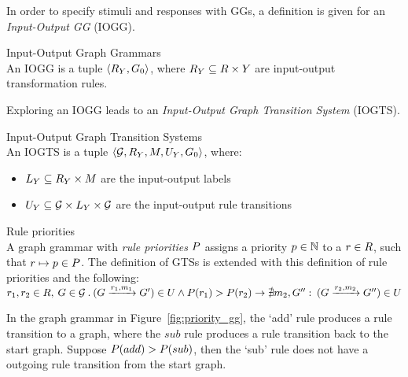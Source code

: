 In order to specify stimuli and responses with GGs, a definition is given for an \textit{Input-Output GG} (IOGG).
\vspace{10px}
\begin{definition} Input-Output Graph Grammars \\
An IOGG is a tuple $\langle R_{Y}, G_0\rangle$, where $R_{Y} \subseteq R \times Y$ are input-output transformation rules.
\end{definition}
\vspace{10px}

Exploring an IOGG leads to an \textit{Input-Output Graph Transition System} (IOGTS).
\vspace{10px}
\begin{definition} Input-Output Graph Transition Systems \\
An IOGTS is a tuple  $\langle \mathcal{G}, R_{Y}, M, U_{Y}, G_0\rangle$, where:
\begin{itemize}
\item {}$L_{Y} \subseteq R_{Y} \times M$ are the input-output labels
\item {}$U_{Y} \subseteq \mathcal{G} \times L_{Y} \times \mathcal{G}$ are the input-output rule transitions
\end{itemize}
\end{definition}

\vspace{10px}
\begin{definition} Rule priorities \\
A graph grammar with \textit{rule priorities} $P$ assigns a priority $p\in\mathbb{N}$ to a $r \in R$, such that ${r \mapsto p}\in P$. The definition of GTSs is extended with this definition of rule priorities and the following:\\
\vspace{5px}
$r_1, r_2\in R,\: G \in \mathcal{G}\: .\: (G \xrightarrow{r_1, m_1}G') \in U \land P(r_1) > P(r_2) \rightarrow \nexists m_2, G'':\: (G \xrightarrow{r_2, m_2}G'') \in U$\\
\end{definition}
\vspace{10px}
In the graph grammar in Figure~\ref{fig:priority_gg}, the `add' rule produces a rule transition to a graph, where the $sub$ rule produces a rule transition back to the start graph. Suppose $P(add) > P(sub)$, then the `sub' rule does not have a outgoing rule transition from the start graph.

